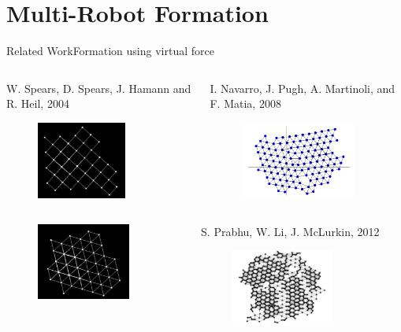 \section{Multi-Robot Formation}
\begin{frame}{Related Work}{Formation using virtual force}
   \begin{columns}[T] 
    \begin{column}{.45\textwidth}
      \scriptsize{W. Spears, D. Spears, J. Hamann and R. Heil, 2004}
      \begin{figure}
        \centering
        \includegraphics[height=1in]{figs/spears1.png}
      \end{figure}
    \end{column}%
    \begin{column}{.45\textwidth}
      \scriptsize{I. Navarro, J. Pugh, A. Martinoli, and
        F. Matia, 2008}
      \begin{figure}
        \centering
        \includegraphics[height=1in]{figs/navarro.png}
      \end{figure}      
    \end{column}
  \end{columns}
  \vspace{3mm}
  \begin{columns}[T] 
    \begin{column}{.45\textwidth}
      \begin{figure}
        \centering
        \includegraphics[height=1in]{figs/spears2.png}     
      \end{figure}  
    \end{column}%
    \begin{column}{.45\textwidth}
      \scriptsize{S. Prabhu, W. Li, J. McLurkin, 2012}
      \begin{figure}
        \centering
        \includegraphics[height=1in]{figs/james.png}
      \end{figure}
    \end{column}
  \end{columns}
\end{frame}

